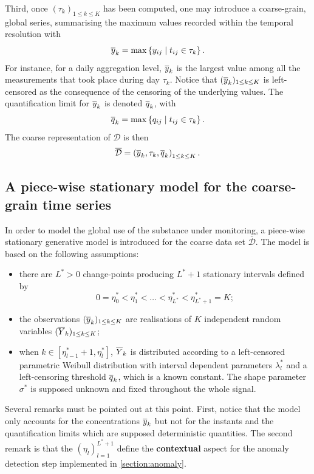 Third, once $(\tau_k)_{1\leq k\leq K}$ has been computed,  one may introduce a coarse-grain, global series, summarising the maximum values recorded within the temporal resolution with
\begin{equation}
\overline{y}_k=\max\left\{y_{ij} \mid t_{ij}\in\tau_k\right\}.
\end{equation}
For instance, for a daily aggregation level, $\overline{y}_k$ is the largest value among all the measurements that took place during day $\tau_k$. Notice that $(\overline{y}_k)_{1\leq k\leq K}$ is left-censored as the consequence of the censoring of the underlying values. The quantification limit for $\overline{y}_k$ is denoted $\overline{q}_k$, with
\begin{equation}
\overline{q}_k=\max\left\{q_{ij}\mid t_{ij}\in\tau_k\right\}.   
\end{equation}
The coarse representation of $\mathcal{D}$ is then
\begin{equation}
\overline{\mathcal{D}}=\left(\overline{y}_k, \tau_k, \overline{q}_k\right)_{1\leq k\leq K}.
\end{equation}

\subsection{A piece-wise stationary model for the coarse-grain time series}\label{subsection:pwsm}

In order to model the global use of the substance under monitoring, a piece-wise stationary generative model is introduced for the coarse data set $\overline{\mathcal{D}}$. The model is based on the following assumptions:
\begin{itemize}
    \item there are $L^*>0$ change-points producing $L^*+1$ stationary intervals defined by
\begin{equation*}
0=\eta_0^*<\eta_1^*<\ldots<\eta_{L^*}^*<\eta^*_{L^*+1}=K;    
\end{equation*}    
    \item the observations $(\overline{y}_k)_{1\leq k\leq K}$ are realisations of $K$ independent random variables $(\overline{Y}_k)_{1\leq k\leq K}$;
    \item when $k\in [\eta^*_{l-1}+1, \eta^*_{l}]$, $\overline{Y}_k$ is distributed according to a left-censored parametric Weibull distribution with interval dependent parameters $\lambda^*_l$ and a left-censoring threshold $\overline{q}_k$, which is a known constant. The shape parameter $\sigma^*$ is supposed unknown and fixed throughout the whole signal. 
\end{itemize}
Several remarks must be pointed out at this point. First, notice that the model only accounts for the concentrations $\overline{y}_k$ but not for the instants and the quantification limits which are supposed deterministic quantities. The second remark is that the $(\eta_l)_{l=1}^{L^*+1}$ define the \textbf{contextual} aspect for the anomaly detection step implemented in \ref{section:anomaly}.  

